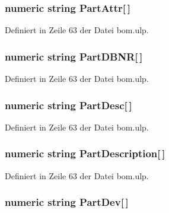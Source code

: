 \subsubsection[{Part\+Attr}]{\setlength{\rightskip}{0pt plus 5cm}numeric string Part\+Attr\mbox{[}$\,$\mbox{]}}\label{bom_8ulp_a7ad4d91e419214c185366026054e1ee8}


Definiert in Zeile 63 der Datei bom.\+ulp.

\hypertarget{bom_8ulp_a91c7af708be7031d4c7f7702147482a7}{}
\subsubsection[{Part\+D\+B\+N\+R}]{\setlength{\rightskip}{0pt plus 5cm}numeric string Part\+D\+B\+N\+R\mbox{[}$\,$\mbox{]}}\label{bom_8ulp_a91c7af708be7031d4c7f7702147482a7}


Definiert in Zeile 63 der Datei bom.\+ulp.

\hypertarget{bom_8ulp_a4714c6a59c5bcd5682043afe0a20721c}{}
\subsubsection[{Part\+Desc}]{\setlength{\rightskip}{0pt plus 5cm}numeric string Part\+Desc\mbox{[}$\,$\mbox{]}}\label{bom_8ulp_a4714c6a59c5bcd5682043afe0a20721c}


Definiert in Zeile 63 der Datei bom.\+ulp.

\hypertarget{bom_8ulp_a6228403db921b2ffe35b1d6fcc5c2beb}{}
\subsubsection[{Part\+Description}]{\setlength{\rightskip}{0pt plus 5cm}numeric string Part\+Description\mbox{[}$\,$\mbox{]}}\label{bom_8ulp_a6228403db921b2ffe35b1d6fcc5c2beb}


Definiert in Zeile 63 der Datei bom.\+ulp.

\hypertarget{bom_8ulp_a40b6e54b771e9907cd576cabac8f59c1}{}
\subsubsection[{Part\+Dev}]{\setlength{\rightskip}{0pt plus 5cm}numeric string Part\+Dev\mbox{[}$\,$\mbox{]}}\label{bom_8ulp_a40b6e54b771e9907cd576cabac8f59c1}


